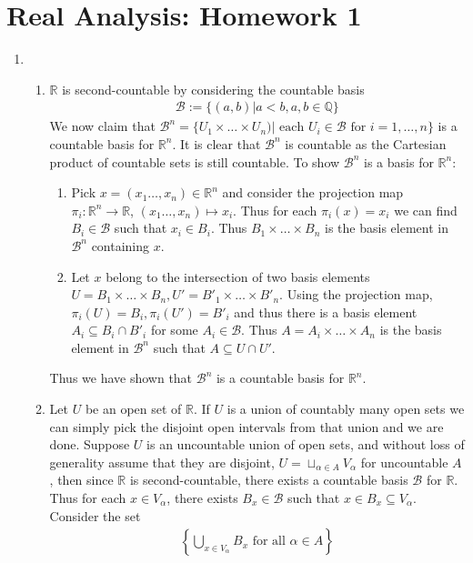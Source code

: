 \documentclass[a4paper,12pt]{article}
\theoremstyle{definition}
\begin{document}
\section*{Real Analysis: Homework 1}

\begin{enumerate}

\item
\begin{enumerate}
\item $\mathbb{R}$ is second-countable by considering the countable basis 
\begin{align*}
\mathcal{B}:=\{(a,b)| a<b, a,b \in \mathbb{Q}\}
\end{align*}
We now claim that $\mathcal{B}^n = \{U_1\times \ldots\times U_n)|\text{ each }U_i\in \mathcal{B}\text{ for }i=1,\ldots, n\}$ is a countable basis for $\mathbb{R}^n$. It is clear that $\mathcal{B}^n$ is countable as the Cartesian product of countable sets is still countable. To show $\mathcal{B}^n$ is a basis for $\mathbb{R}^n$:
\begin{enumerate}[(1)]
\item Pick $x = (x_1\ldots, x_n) \in \mathbb{R}^n$ and consider the projection map $\pi_i: \mathbb{R}^n \to \mathbb{R}$, $(x_1\ldots, x_n) \mapsto x_i$. Thus for each $\pi_i(x) = x_i$ we can find $B_i \in \mathcal{B}$ such that $x_i \in B_i$. Thus $B_1 \times \ldots \times B_n$ is the basis element in $\mathcal{B}^n$ containing $x$.
\item Let $x$ belong to the intersection of two basis elements $U = B_1 \times \ldots \times B_n, U' = B'_1 \times \ldots \times B'_n$. Using the projection map, $\pi_i(U) = B_i, \pi_i(U') = B'_i$ and thus there is a basis element $A_i \subseteq B_i \cap B'_i$ for some $A_i \in \mathcal{B}$. Thus $A = A_i \times \ldots \times A_n$ is the basis element in $\mathcal{B}^n$ such that $A \subseteq U \cap U'$.
\end{enumerate}
Thus we have shown that $\mathcal{B}^n$ is a countable basis for $\mathbb{R}^n$.



\item Let $U$ be an open set of $\mathbb{R}$. If $U$ is a union of countably many open sets we can simply pick the disjoint open intervals from that union and we are done. Suppose $U$ is an uncountable union of open sets, and without loss of generality assume that they are disjoint, $U = \sqcup_{\alpha \in A}V_\alpha$ for uncountable $A$, then since $\mathbb{R}$ is second-countable, there exists a countable basis $\mathcal{B}$ for $\mathbb{R}$. Thus for each $x \in V_\alpha$, there exists $B_x \in \mathcal{B}$ such that $x \in B_x \subseteq V_\alpha$. Consider the set 
\begin{align*}
\left\{\bigcup_{x\in V_\alpha} B_x \text{ for all }\alpha \in A\right\}
\end{align*}



\end{enumerate}
\end{enumerate}
\end{document}
